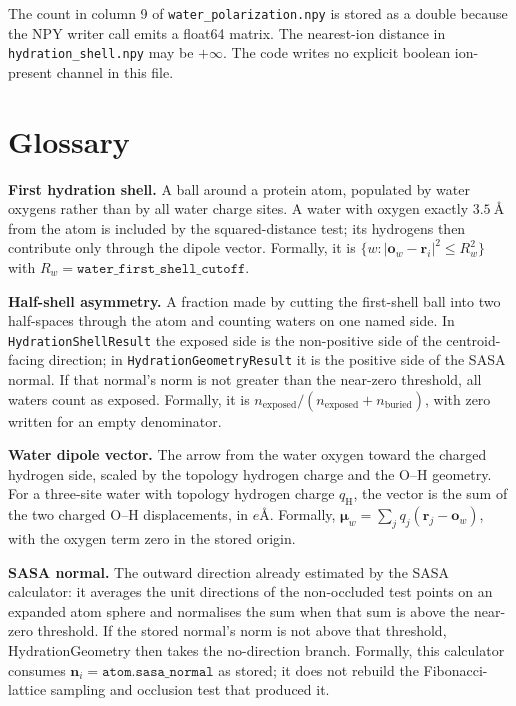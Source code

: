 \documentclass[11pt]{article}
\newcommand{\code}[1]{\texttt{#1}}
\begin{document}
The count in column 9 of \code{water\_polarization.npy} is stored as a double
because the NPY writer call emits a float64 matrix. The nearest-ion distance in
\code{hydration\_shell.npy} may be \(+\infty\). The code writes no explicit
boolean ion-present channel in this file.

\section{Glossary}

\textbf{First hydration shell.} A ball around a protein atom, populated by
water oxygens rather than by all water charge sites. A water with oxygen exactly
\(\SI{3.5}{\angstrom}\) from the atom is included by the squared-distance test;
its hydrogens then contribute only through the dipole vector. Formally, it is
\(\{w:|\bm o_w-\bm r_i|^2\le R_w^2\}\) with
\(R_w=\code{water\_first\_shell\_cutoff}\).

\textbf{Half-shell asymmetry.} A fraction made by cutting the first-shell ball
into two half-spaces through the atom and counting waters on one named side. In
\code{HydrationShellResult} the exposed side is the non-positive side of the
centroid-facing direction; in \code{HydrationGeometryResult} it is the positive
side of the SASA normal. If that normal's norm is not greater than the near-zero
threshold, all waters count as exposed. Formally, it is \(n_{\mathrm{exposed}}/
(n_{\mathrm{exposed}}+n_{\mathrm{buried}})\), with zero written for an empty
denominator.

\textbf{Water dipole vector.} The arrow from the water oxygen toward the
charged hydrogen side, scaled by the topology hydrogen charge and the O--H
geometry. For a three-site water with topology hydrogen charge \(q_{\mathrm H}\),
the vector is the sum of the two charged O--H displacements, in
\(\si{\elementarycharge\angstrom}\). Formally,
\(\bm\mu_w=\sum_j q_j(\bm r_j-\bm o_w)\), with the oxygen term zero in the
stored origin.

\textbf{SASA normal.} The outward direction already estimated by the SASA
calculator: it averages the unit directions of the non-occluded test points on
an expanded atom sphere and normalises the sum when that sum is above the
near-zero threshold. If the stored normal's norm is not above that threshold,
HydrationGeometry then takes the no-direction branch.
Formally, this calculator consumes \(\bm n_i=\code{atom.sasa\_normal}\) as
stored; it does not rebuild the Fibonacci-lattice sampling and occlusion test
that produced it.
\end{document}
